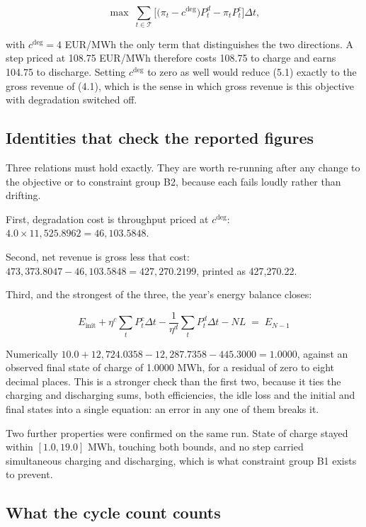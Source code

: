 \documentclass[11pt,a4paper]{article}
\numberwithin{equation}{section}
\begin{document}
\begin{equation}
\max \; \sum_{t \in \mathcal{T}}
  \Big[ \big( \pi_t - c^{\deg} \big) P^{d}_{t} - \pi_t P^{c}_{t} \Big] \Delta t ,
\end{equation}

with $c^{\deg} = 4$ EUR/MWh the only term that distinguishes the two directions.
A step priced at 108.75 EUR/MWh therefore costs 108.75 to charge and earns 104.75
to discharge. Setting $c^{\deg}$ to zero as well would reduce (5.1) exactly to the
gross revenue of (4.1), which is the sense in which gross revenue is this
objective with degradation switched off.

\subsection{Identities that check the reported figures}

Three relations must hold exactly. They are worth re-running after any change to
the objective or to constraint group B2, because each fails loudly rather than
drifting.

First, degradation cost is throughput priced at $c^{\deg}$:
$4.0 \times 11{,}525.8962 = 46{,}103.5848$.

Second, net revenue is gross less that cost:
$473{,}373.8047 - 46{,}103.5848 = 427{,}270.2199$, printed as 427{,}270.22.

Third, and the strongest of the three, the year's energy balance closes:

\begin{equation}
E_{\text{init}}
  + \eta^{c} \textstyle\sum_t P^{c}_{t} \Delta t
  - \frac{1}{\eta^{d}} \textstyle\sum_t P^{d}_{t} \Delta t
  - N L
  \;=\; E_{N-1}
\end{equation}

Numerically $10.0 + 12{,}724.0358 - 12{,}287.7358 - 445.3000 = 1.0000$, against an
observed final state of charge of 1.0000 MWh, for a residual of zero to eight
decimal places. This is a stronger check than the first two, because it ties the
charging and discharging sums, both efficiencies, the idle loss and the initial
and final states into a single equation: an error in any one of them breaks it.

Two further properties were confirmed on the same run. State of charge stayed
within $[1.0, 19.0]$ MWh, touching both bounds, and no step carried simultaneous
charging and discharging, which is what constraint group B1 exists to prevent.

\subsection{What the cycle count counts}
\end{document}
